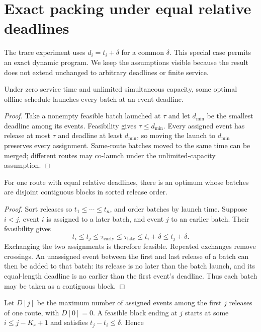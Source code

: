 \section{Exact packing under equal relative deadlines}
\label{sec:exact}

The trace experiment uses $d_i=t_i+\delta$ for a common $\delta$. This special
case permits an exact dynamic program. We keep the assumptions visible because
the result does not extend unchanged to arbitrary deadlines or finite service.

\begin{proposition}
\label{prop:deadlines}
Under zero service time and unlimited simultaneous capacity, some optimal
offline schedule launches every batch at an event deadline.
\end{proposition}

\begin{proof}
Take a nonempty feasible batch launched at $\tau$ and let $d_{\min}$ be the
smallest deadline among its events. Feasibility gives $\tau\leq d_{\min}$.
Every assigned event has release at most $\tau$ and deadline at least
$d_{\min}$, so moving the launch to $d_{\min}$ preserves every assignment.
Same-route batches moved to the same time can be merged; different routes may
co-launch under the unlimited-capacity assumption.
\end{proof}

\begin{lemma}
\label{lem:blocks}
For one route with equal relative deadlines, there is an optimum whose batches
are disjoint contiguous blocks in sorted release order.
\end{lemma}

\begin{proof}
Sort releases so $t_1\leq\cdots\leq t_n$, and order batches by launch time.
Suppose $i<j$, event $i$ is assigned to a later batch, and event $j$ to an
earlier batch. Their feasibility gives
\[
 t_i\leq t_j\leq\tau_{\mathrm{early}}\leq
 \tau_{\mathrm{late}}\leq t_i+\delta\leq t_j+\delta.
\]
Exchanging the two assignments is therefore feasible. Repeated exchanges
remove crossings. An unassigned event between the first and last release of a
batch can then be added to that batch: its release is no later than the batch
launch, and its equal-length deadline is no earlier than the first event's
deadline. Thus each batch may be taken as a contiguous block.
\end{proof}

Let $D[j]$ be the maximum number of assigned events among the first $j$
releases of one route, with $D[0]=0$. A feasible block ending at $j$ starts at
some $i\leq j-K_r+1$ and satisfies $t_j-t_i\leq\delta$. Hence

